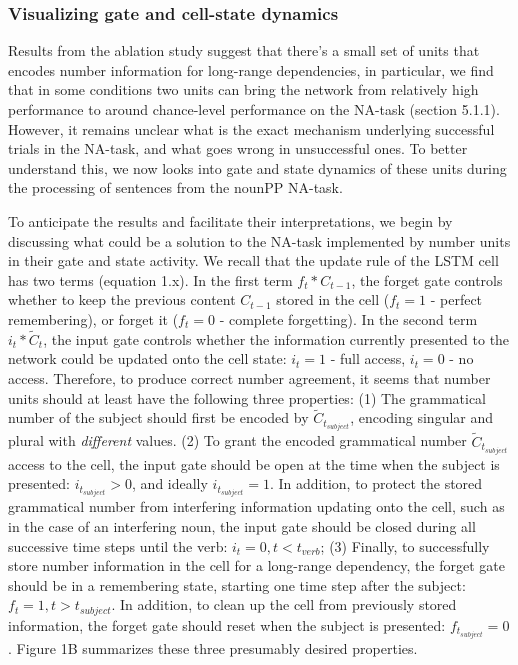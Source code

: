 \subsubsection{Visualizing gate and cell-state dynamics}
Results from the ablation study suggest that there's a small set of units that encodes number information for long-range dependencies, in particular, we find that in some conditions two units can bring the network from relatively high performance to around chance-level performance on the NA-task (section 5.1.1). 
However, it remains unclear what is the exact mechanism underlying successful trials in the NA-task, and what goes wrong in unsuccessful ones. 
To better understand this, we now looks into gate and state dynamics of these units during the processing of sentences from the nounPP NA-task. 

To anticipate the results and facilitate their interpretations, we begin by discussing what could be a solution to the NA-task implemented by number units in their gate and state activity. 
We recall that the update rule of the LSTM cell has two terms (equation 1.x). 
In the first term $f_t * C_{t-1}$, the forget gate controls whether to keep the previous content $C_{t-1}$ stored in the cell ($f_t=1$ - perfect remembering), or forget it ($f_t=0$ - complete forgetting). 
In the second term $i_t*\tilde{C}_t$, the input gate controls whether the information currently presented to the network could be updated onto the cell state: $i_t=1$ - full access, $i_t=0$ - no access. 
Therefore, to produce correct number agreement, it seems that number units should at least have the following three properties: (1) The grammatical number of the subject should first be encoded by $\tilde{C}_{t_{subject}}$, encoding singular and plural with \textit{different} values. 
(2) To grant the encoded grammatical number $\tilde{C}_{t_{subject}}$ access to the cell, the input gate should be open at the time when the subject is presented: $i_{t_{subject}}>0$, and ideally $i_{t_{subject}}=1$. 
In addition, to protect the stored grammatical number from interfering information updating onto the cell, such as in the case of an interfering noun, the input gate should be closed during all successive time steps until the verb: $i_t=0, t<t_{verb}$; (3) Finally, to successfully store number information in the cell for a long-range dependency, the forget gate should be in a remembering state, starting one time step after the subject: $f_t=1, t>t_{subject}$. 
In addition, to clean up the cell from previously stored information, the forget gate should reset when the subject is presented: $f_{t_{subject}}=0$. 
Figure 1B summarizes these three presumably desired properties.

